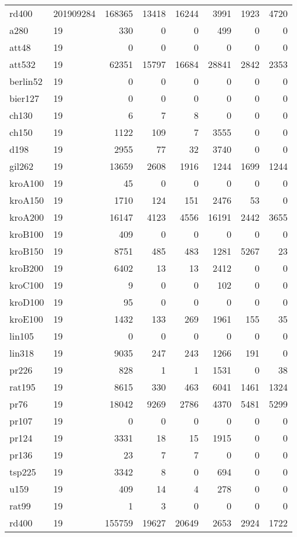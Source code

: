 \begin{center}
\begin{longtable}{llrrrrrr}
rd400 & 201909284 & 168365 & 13418 & 16244 & 3991 & 1923 & 4720\\
a280 & 19 & 330 & 0 & 0 & 499 & 0 & 0\\
att48  & 19 & 0 & 0 & 0 & 0 & 0 & 0\\
att532  & 19 & 62351 & 15797 & 16684 & 28841 & 2842 & 2353\\
berlin52  & 19 & 0 & 0 & 0 & 0 & 0 & 0\\
bier127  & 19 & 0 & 0 & 0 & 0 & 0 & 0\\
ch130  & 19 & 6 & 7 & 8 & 0 & 0 & 0\\
ch150  & 19 & 1122 & 109 & 7 & 3555 & 0 & 0\\
d198  & 19 & 2955 & 77 & 32 & 3740 & 0 & 0\\
gil262  & 19 & 13659 & 2608 & 1916 & 1244 & 1699 & 1244\\
kroA100  & 19 & 45 & 0 & 0 & 0 & 0 & 0\\
kroA150  & 19 & 1710 & 124 & 151 & 2476 & 53 & 0\\
kroA200  & 19 & 16147 & 4123 & 4556 & 16191 & 2442 & 3655\\
kroB100  & 19 & 409 & 0 & 0 & 0 & 0 & 0\\
kroB150 & 19 & 8751 & 485 & 483 & 1281 & 5267 & 23\\
kroB200  & 19 & 6402 & 13 & 13 & 2412 & 0 & 0\\
kroC100  & 19 & 9 & 0 & 0 & 102 & 0 & 0\\
kroD100  & 19 & 95 & 0 & 0 & 0 & 0 & 0\\
kroE100  & 19 & 1432 & 133 & 269 & 1961 & 155 & 35\\
lin105  & 19 & 0 & 0 & 0 & 0 & 0 & 0\\
lin318  & 19 & 9035 & 247 & 243 & 1266 & 191 & 0\\
pr226  & 19 & 828 & 1 & 1 & 1531 & 0 & 38\\
rat195  & 19 & 8615 & 330 & 463 & 6041 & 1461 & 1324\\
pr76  & 19 & 18042 & 9269 & 2786 & 4370 & 5481 & 5299\\
pr107  & 19 & 0 & 0 & 0 & 0 & 0 & 0\\
pr124  & 19 & 3331 & 18 & 15 & 1915 & 0 & 0\\
pr136  & 19 & 23 & 7 & 7 & 0 & 0 & 0\\
tsp225  & 19 & 3342 & 8 & 0 & 694 & 0 & 0\\
u159  & 19 & 409 & 14 & 4 & 278 & 0 & 0\\
rat99  & 19 & 1 & 3 & 0 & 0 & 0 & 0\\
rd400  & 19 & 155759 & 19627 & 20649 & 2653 & 2924 & 1722\\

\end{longtable}
\end{center}
